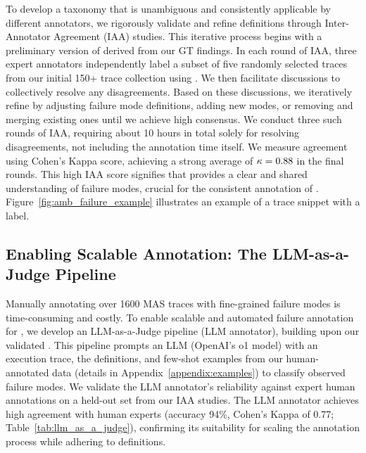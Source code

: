 To develop a taxonomy that is unambiguous and consistently applicable by different annotators, we rigorously validate and refine \taxonomy{} definitions through Inter-Annotator Agreement (IAA) studies. This iterative process begins with a preliminary version of \taxonomy{} derived from our GT findings. In each round of IAA, three expert annotators independently label a subset of five randomly selected traces from our initial 150+ trace collection using \taxonomy{}. We then facilitate discussions to collectively resolve any disagreements. Based on these discussions, we iteratively refine \taxonomy{} by adjusting failure mode definitions, adding new modes, or removing and merging existing ones until we achieve high consensus. We conduct three such rounds of IAA, requiring about 10 hours in total solely for resolving disagreements, not including the annotation time itself. We measure agreement using Cohen's Kappa score, achieving a strong average of $\kappa = 0.88{}$ in the final rounds. This high IAA score signifies that \taxonomy{} provides a clear and shared understanding of failure modes, crucial for the consistent annotation of \dataset{}. Figure~\ref{fig:amb_failure_example} illustrates an example of a trace snippet with a \taxonomy{} label.

\subsection{Enabling Scalable Annotation: The LLM-as-a-Judge Pipeline}
\label{sec:llm_annotator}

Manually annotating over 1600 MAS traces with fine-grained failure modes is time-consuming and costly. To enable scalable and automated failure annotation for \dataset{}, we develop an LLM-as-a-Judge pipeline (LLM annotator), building upon our validated \taxonomy{}. This pipeline prompts an LLM (OpenAI's o1 model) with an execution trace, the \taxonomy{} definitions, and few-shot examples from our human-annotated data (details in Appendix~\ref{appendix:examples}) to classify observed failure modes. We validate the LLM annotator's reliability against expert human annotations on a held-out set from our IAA studies. The LLM annotator achieves high agreement with human experts (accuracy 94\%, Cohen's Kappa of 0.77; Table~\ref{tab:llm_as_a_judge}), confirming its suitability for scaling the annotation process while adhering to \taxonomy{} definitions.

